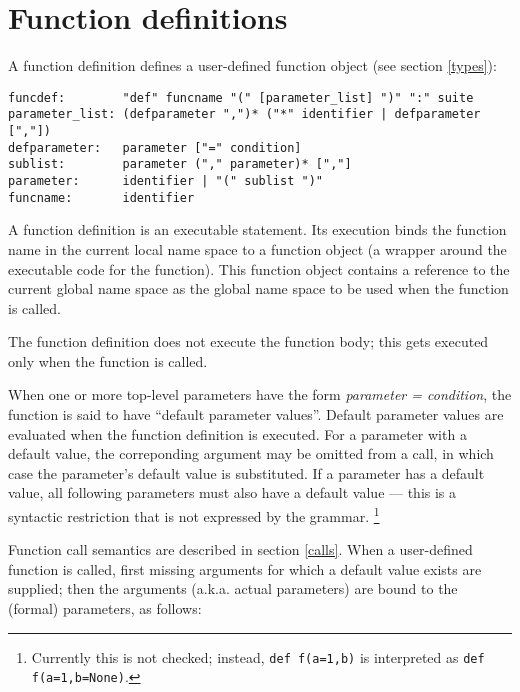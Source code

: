 \section{Function definitions} \label{function}

A function definition defines a user-defined function object (see
section \ref{types}):

\begin{verbatim}
funcdef:        "def" funcname "(" [parameter_list] ")" ":" suite
parameter_list: (defparameter ",")* ("*" identifier | defparameter [","])
defparameter:   parameter ["=" condition]
sublist:        parameter ("," parameter)* [","]
parameter:      identifier | "(" sublist ")"
funcname:       identifier
\end{verbatim}

A function definition is an executable statement.  Its execution binds
the function name in the current local name space to a function object
(a wrapper around the executable code for the function).  This
function object contains a reference to the current global name space
as the global name space to be used when the function is called.

The function definition does not execute the function body; this gets
executed only when the function is called.

When one or more top-level parameters have the form {\em parameter =
condition}, the function is said to have ``default parameter values''.
Default parameter values are evaluated when the function definition is
executed.  For a parameter with a default value, the correponding
argument may be omitted from a call, in which case the parameter's
default value is substituted.  If a parameter has a default value, all
following parameters must also have a default value --- this is a
syntactic restriction that is not expressed by the grammar.%
\footnote{Currently this is not checked; instead,
{\tt def f(a=1,b)} is interpreted as {\tt def f(a=1,b=None)}.}

Function call semantics are described in section \ref{calls}.  When a
user-defined function is called, first missing arguments for which a
default value exists are supplied; then the arguments (a.k.a. actual
parameters) are bound to the (formal) parameters, as follows:

